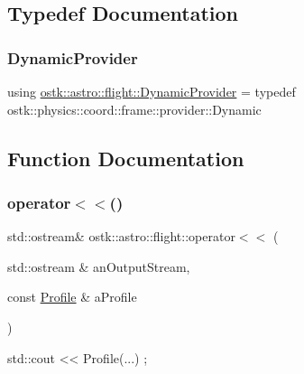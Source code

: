 \subsection{Typedef Documentation}
\mbox{\label{namespaceostk_1_1astro_1_1flight_a30fb17f0f77e97e4d6bb5567218816bd}} 
\subsubsection{\texorpdfstring{Dynamic\+Provider}{DynamicProvider}}
{\footnotesize\ttfamily using \hyperlink{namespaceostk_1_1astro_1_1flight_a30fb17f0f77e97e4d6bb5567218816bd}{ostk\+::astro\+::flight\+::\+Dynamic\+Provider} = typedef ostk\+::physics\+::coord\+::frame\+::provider\+::\+Dynamic}



\subsection{Function Documentation}
\mbox{\label{namespaceostk_1_1astro_1_1flight_ad4a6bc77a55e55a29abdc5b4e3d8a346}} 
\subsubsection{\texorpdfstring{operator$<$$<$()}{operator<<()}\hspace{0.1cm}{\footnotesize\ttfamily [1/2]}}
{\footnotesize\ttfamily std\+::ostream\& ostk\+::astro\+::flight\+::operator$<$$<$ (\begin{DoxyParamCaption}\item[{std\+::ostream \&}]{an\+Output\+Stream,  }\item[{const \hyperlink{classostk_1_1astro_1_1flight_1_1_profile}{Profile} \&}]{a\+Profile }\end{DoxyParamCaption})}


\begin{DoxyCode}
std::cout << Profile(...) ;
\end{DoxyCode}



